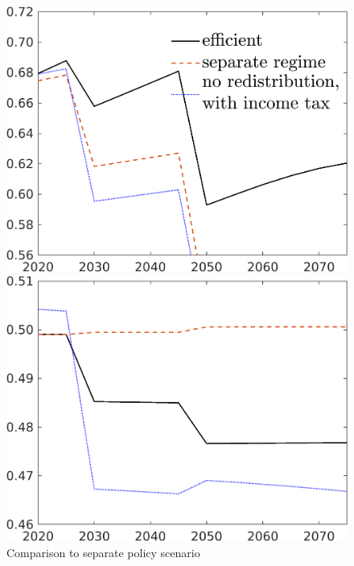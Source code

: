 \begin{figure}[h!!]
	\centering
	\caption{Comparison to separate policy scenario}\label{fig:comp_nored}
	
	\begin{minipage}[]{0.32\textwidth}
		\includegraphics[width=1\textwidth]{../../codding_model/own_basedOnFried/optimalPol_190722_tidiedUp/figures/all_July22/C_DDCompEffOPT_T_NoTaus_pol3_spillover0_noskill0_sep1_xgrowth0_etaa0.79_lgd1_lff0.png}
	\end{minipage}
	\begin{minipage}[]{0.32\textwidth}
		\includegraphics[width=1\textwidth]{../../codding_model/own_basedOnFried/optimalPol_190722_tidiedUp/figures/all_July22/hh_DDCompEffOPT_T_NoTaus_pol3_spillover0_noskill0_sep1_xgrowth0_etaa0.79_lgd0_lff0.png}

\end{minipage}
\end{figure}
